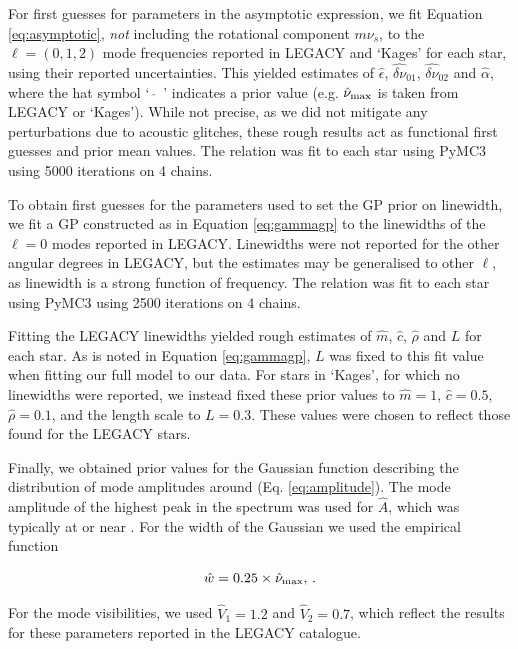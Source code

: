 For first guesses for parameters in the asymptotic expression, we fit Equation \ref{eq:asymptotic}, \textit{not} including the rotational component $m\nu_s$, to the $\ell = (0, 1, 2)$ mode frequencies reported in LEGACY and `Kages' for each star, using their reported uncertainties. This yielded estimates of $\hat{\epsilon}$, $\widehat{\delta\nu}_{01}$, $\widehat{\delta\nu}_{02}$ and $\hat{\alpha}$, where the hat symbol `\, $\widehat{}$\, ' indicates a prior value (e.g. $\hat{\nu}_{\rm max}$ is taken from LEGACY or `Kages'). While not precise, as we did not mitigate any perturbations due to acoustic glitches, these rough results act as functional first guesses and prior mean values. The relation was fit to each star using PyMC3 \cite{salvatier+2016} using 5000 iterations on 4 chains.

To obtain first guesses for the parameters used to set the GP prior on linewidth, we fit a GP constructed as in Equation \ref{eq:gammagp} to the linewidths of the $\ell = 0$ modes reported in LEGACY. Linewidths were not reported for the other angular degrees in LEGACY, but the estimates may be generalised to other $\ell$, as linewidth is a strong function of frequency.  The relation was fit to each star using PyMC3 using 2500 iterations on 4 chains.

Fitting the LEGACY linewidths yielded rough estimates of $\hat{m}$, $\hat{c}$, $\hat{\rho}$ and $L$ for each star. As is noted in Equation \ref{eq:gammagp}, $L$ was fixed to this fit value when fitting our full model to our data. For stars in `Kages', for which no linewidths were reported, we instead fixed these prior values to $\hat{m} = 1$, $\hat{c} = 0.5$, $\hat{\rho} = 0.1$, and the length scale to $L = 0.3$. These values were chosen to reflect those found for the LEGACY stars.

Finally, we obtained prior values for the Gaussian function describing the distribution of mode amplitudes around \numax (Eq. \ref{eq:amplitude}). The mode amplitude of the highest peak in the spectrum was used for $\hat{A}$, which was typically at or near \numax. For the width of the Gaussian we used the empirical function \cite{lund+2017}

\begin{equation}
	\hat{w} = 0.25 \times \hat{\nu}_{\rm max},\, .
\end{equation}

\noindent For the mode visibilities, we used $\hat{V}_1 = 1.2$ and $\hat{V}_2 = 0.7$, which reflect the results for these parameters reported in the LEGACY catalogue.

